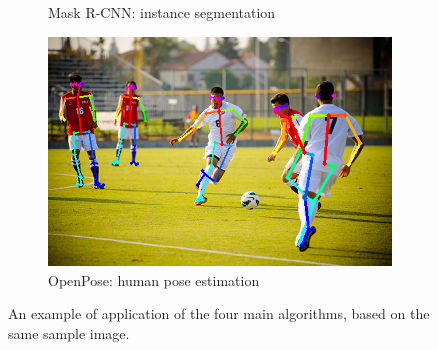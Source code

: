 \begin{figure}[!h]
\begin{subfigure}{.45\linewidth}
		\caption{Mask R-CNN: instance segmentation}
	\end{subfigure}
	\begin{subfigure}{.45\linewidth}
		\includegraphics[width=\linewidth]{images/detection/ex3_openpose}
		\caption{OpenPose: human pose estimation}
	\end{subfigure}
	\captionsetup{margin=0.5cm}
	\caption[YOLO, SSD, Mask R-CNN and OpenPose applied on the same image.]{An example of application of the four main algorithms, based on the same sample image.}
	\label{fig:ex_detectionAlgorithms}
\end{figure}






